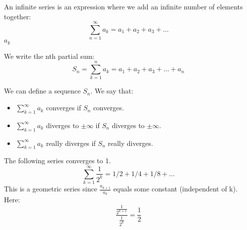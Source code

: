 \documentclass[../main.tex]{subfiles}
\begin{document}

\begin{definition}
    An infinite series is an expression where we add an infinite number of elements together:
    \[ \sum_{n=1}^{\infty}{a_{k}}=a_{1}+a_{2}+a_{3}+\dots \]
    \( a_{k} \) 
\end{definition}

\begin{definition}
    We write the nth partial sum:
    \[ S_n = \sum_{k=1}^n a_{k} = a_{1} + a_{2} + a_{3} + \dots +a_{n} \]
\end{definition}

We can define a sequence {\( S_{n} \)}. We say that:
\begin{itemize}
    \item \( \sum_{k=1}^\infty a_{k} \) converges if {\( S_{n} \)} converges.
    \item \( \sum_{k=1}^\infty a_{k} \) diverges to \( \pm \infty \) if {\( S_{n} \)} diverges to \( \pm \infty \).
    \item \( \sum_{k=1}^\infty a_{k} \) really diverges if {\( S_{n} \)} really diverges.
\end{itemize}

\begin{example}[Geometric Series (r=1/2)]
    The following series converges to 1.
    \[ \sum_{k=1}^\infty \frac{1}{2^k}= 1/2 + 1/4 + 1/8 + \dots \]
    This is a geometric series since \( \frac{a_{k+1}}{a_{k}} \) equals some constant (independent of k). Here:
    \[ \frac{\frac{1}{2^{k+1}}}{\frac{1}{2^k}}=\frac{1}{2} \]
\end{example}
\end{document}
